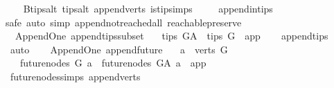 \begin{isabellebody}
%
\isadelimproof
\ \ %
\endisadelimproof
%
\isatagproof
{}\isamarkupfalse%
\ B{}{\isachardot}{\kern0pt}tips{\isacharunderscore}{\kern0pt}alt\ tips{\isacharunderscore}{\kern0pt}alt\ append{\isacharunderscore}{\kern0pt}verts\ is{\isacharunderscore}{\kern0pt}tip{\isachardot}{\kern0pt}simps\ \isanewline
\ \ \isamarkupfalse%
\ append{\isacharunderscore}{\kern0pt}in{\isacharunderscore}{\kern0pt}tips\ \isanewline
{}\isamarkupfalse%
{\isacharparenleft}{\kern0pt}safe{\isacharcomma}{\kern0pt}\ auto\ simp{\isacharcolon}{\kern0pt}\ append{\isacharunderscore}{\kern0pt}not{\isacharunderscore}{\kern0pt}reached{\isacharunderscore}{\kern0pt}all\ reachable{}{\isacharunderscore}{\kern0pt}preserve{\isacharparenright}{\kern0pt}\ \isamarkupfalse%
%
\endisatagproof
{\isafoldproof}%
%
\isadelimproof
\isanewline
%
\endisadelimproof
{}\isamarkupfalse%
\isanewline
\isanewline
{}\isamarkupfalse%
\ {\isacharparenleft}{\kern0pt}\ Append{\isacharunderscore}{\kern0pt}One{\isacharparenright}{\kern0pt}\ append{\isacharunderscore}{\kern0pt}tips{\isacharunderscore}{\kern0pt}subset{\isacharcolon}{\kern0pt}\isanewline
\ \ {\isachardoublequoteopen}\ tips\ G{\isacharunderscore}{\kern0pt}A\ {\isasymsubseteq}\ tips\ G\ {\isasymunion}\ {\isacharbraceleft}{\kern0pt}app{\isacharbraceright}{\kern0pt}{\isachardoublequoteclose}\isanewline
%
\isadelimproof
\ \ %
\endisadelimproof
%
\isatagproof
{}\isamarkupfalse%
\ append{\isacharunderscore}{\kern0pt}tips\isanewline
\ \ \isamarkupfalse%
\ auto%
\endisatagproof
{\isafoldproof}%
%
\isadelimproof
\ \isanewline
%
\endisadelimproof
\isanewline
\isanewline
{}\isamarkupfalse%
\ {\isacharparenleft}{\kern0pt}\ Append{\isacharunderscore}{\kern0pt}One{\isacharparenright}{\kern0pt}\ append{\isacharunderscore}{\kern0pt}future{\isacharcolon}{\kern0pt}\isanewline
\ \ \ {\isachardoublequoteopen}a\ {\isasymin}\ verts\ G{\isachardoublequoteclose}\isanewline
\ \ \ {\isachardoublequoteopen}future{\isacharunderscore}{\kern0pt}nodes\ G\ a\ {\isacharequal}{\kern0pt}\ future{\isacharunderscore}{\kern0pt}nodes\ G{\isacharunderscore}{\kern0pt}A\ a\ {\isacharminus}{\kern0pt}\ {\isacharbraceleft}{\kern0pt}app{\isacharbraceright}{\kern0pt}{\isachardoublequoteclose}\isanewline
%
\isadelimproof
\ \ %
\endisadelimproof
%
\isatagproof
{}\isamarkupfalse%
\ future{\isacharunderscore}{\kern0pt}nodes{\isachardot}{\kern0pt}simps\ append{\isacharunderscore}{\kern0pt}verts\isanewline

\end{isabellebody}
